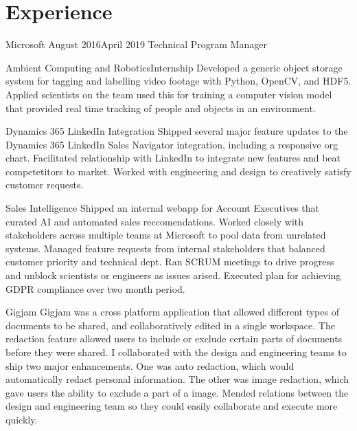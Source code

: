 \documentclass[]{../resume}
\author{Caleb Thorsteinson}
\begin{document}

\section{Experience}

\begin{employer}[../microsoft]{Microsoft} {August 2016}{April 2019}
  {Technical Program Manager}
\begin{team}{Ambient Computing and Robotics}{Internship}
  Developed a generic object storage system
  for tagging and labelling
  video footage
  with Python, OpenCV, and HDF5.
  Applied scientists on the team
  used this for training a computer vision model
  that provided real time tracking
  of people and objects in an environment.
\end{team}
\begin{team}{Dynamics 365 LinkedIn Integration}{}
  Shipped several major feature updates
  to the Dynamics 365 LinkedIn Sales Navigator integration,
  including a responsive org chart.
  Facilitated relationship with LinkedIn
  to integrate new features
  and beat competetitors to market.
  Worked with engineering and design
  to creatively satisfy customer requests.
\end{team}
\begin{team}{Sales Intelligence}{}
  Shipped an internal webapp
  for Account Executives
  that curated AI and automated sales reccomendations.
  Worked closely with stakeholders
  across multiple teams at Microsoft
  to pool data from unrelated systems.
  Managed feature requests
  from internal stakeholders
  that balanced customer priority
  and technical dept.
  Ran SCRUM meetings
  to drive progress
  and unblock scientists or engineers
  as issues arised.
  Executed plan for achieving GDPR compliance
  over two month period.
\end{team}
\begin{team}{Gigjam}{}
  Gigjam was a cross platform application
  that allowed different types of documents
  to be shared,
  and collaboratively edited
  in a single workspace.
  The redaction feature
  allowed users to include or exclude
  certain parts of documents before they were shared.
  I collaborated with the design and engineering teams
  to ship two major enhancements.
  One was auto redaction,
  which would automatically redact personal information.
  The other was image redaction,
  which gave users
  the ability to exclude a part of a image.
  Mended relations between the design and engineering team
  so they could easily collaborate
  and execute more quickly.
\end{team}
\end{employer}
\end{document}

